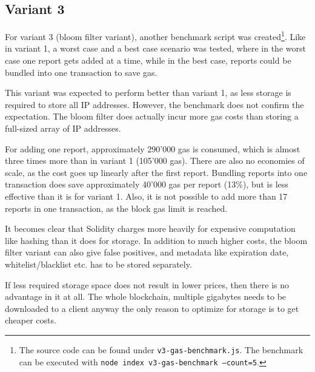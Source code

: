 \subsection{Variant 3}
For variant 3 (bloom filter variant), another benchmark script was created\footnote{The source code can be found under \texttt{v3-gas-benchmark.js}. The benchmark can be executed with \texttt{node index v3-gas-benchmark --count=5}.}. Like in variant 1, a worst case and a best case scenario was tested, where in the worst case one report gets added at a time, while in the best case, reports could be bundled into one transaction to save gas.

This variant was expected to perform better than variant 1, as less storage is required to store all IP addresses. However, the benchmark does not confirm the expectation. The bloom filter does actually incur more gas costs than storing a full-sized array of IP addresses. 

For adding one report, approximately 290'000 gas is consumed, which is almost three times more than in variant 1 (105'000 gas). There are also no economies of scale, as the cost goes up linearly after the first report. Bundling reports into one transaction does save approximately 40'000 gas per report (13\%), but is less effective than it is for variant 1. Also, it is not possible to add more than 17 reports in one transaction, as the block gas limit is reached.

It becomes clear that Solidity charges more heavily for expensive computation like hashing than it does for storage.
In addition to much higher costs, the bloom filter variant can also give false positives, and metadata like expiration date, whitelist/blacklist etc. has to be stored separately.

If less required storage space does not result in lower prices, then there is no advantage in it at all. The whole blockchain, multiple gigabytes needs to be downloaded to a client anyway \textemdash {} the only reason to optimize for storage is to get cheaper costs.
